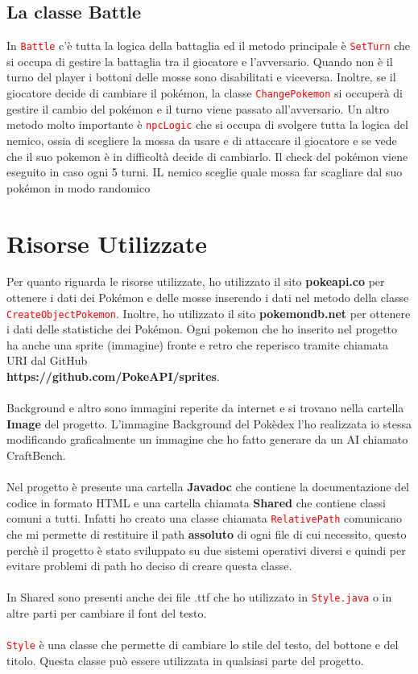 \documentclass[12pt]{article}
\begin{document}
\subsection{La classe Battle}
In \texttt{\textcolor{red}{Battle}} c'è tutta la logica della battaglia ed il metodo principale è \texttt{\textcolor{red}{SetTurn}} che si occupa di gestire la battaglia tra il giocatore e l'avversario.
Quando non è il turno del player i bottoni delle mosse sono disabilitati e viceversa. Inoltre, se il giocatore decide di cambiare il pokémon, la classe \texttt{\textcolor{red}{ChangePokemon}} si occuperà di gestire il cambio del pokémon e il turno viene passato all'avversario. Un altro metodo molto importante è \texttt{\textcolor{red}{npcLogic}} che si occupa di svolgere tutta la logica del nemico, ossia di scegliere la mossa da usare e di attaccare il giocatore e se vede che il suo pokemon è in difficoltà decide di cambiarlo. 
Il check del pokémon viene eseguito in caso ogni 5 turni. IL nemico sceglie quale mossa far scagliare dal suo pokémon in modo randomico\\
\section{Risorse Utilizzate}
Per quanto riguarda le risorse utilizzate, ho utilizzato il sito \textbf{pokeapi.co} per ottenere i dati dei Pokémon e delle mosse inserendo i dati nel metodo della classe \texttt{\textcolor{red}{CreateObjectPokemon}}. Inoltre, ho utilizzato il sito \textbf{pokemondb.net} per ottenere i dati delle statistiche dei Pokémon.
Ogni pokemon che ho inserito nel progetto ha anche una sprite (immagine) fronte e retro che reperisco tramite chiamata URI dal GitHub \\ \textbf{https://github.com/PokeAPI/sprites}.
\\ \\ 
Background e altro sono immagini reperite da internet e si trovano nella cartella \textbf{Image} del progetto. L'immagine Background del Pokèdex l'ho realizzata io stessa modificando graficalmente un immagine che ho fatto generare da un AI chiamato CraftBench.
\\ \\
Nel progetto è presente una cartella \textbf{Javadoc} che contiene la documentazione del codice in formato HTML e una cartella chiamata \textbf{Shared} che contiene classi comuni a tutti.
Infatti ho creato una classe chiamata \texttt{\textcolor{red}{RelativePath}} comunicano che mi permette di restituire il path \textbf{assoluto} di ogni file di cui necessito, questo perchè il progetto è stato sviluppato su due sistemi operativi diversi e quindi per evitare problemi di path ho deciso di creare questa classe.
\\ \\
In Shared sono presenti anche dei file .ttf che ho utilizzato in \texttt{\textcolor{red}{Style.java}} o in altre parti per cambiare il font del testo.
\\ \\
\texttt{\textcolor{red}{Style}} è una classe che permette di cambiare lo stile del testo, del bottone e del titolo. Questa classe può essere utilizzata in qualsiasi parte del progetto.
\end{document}
